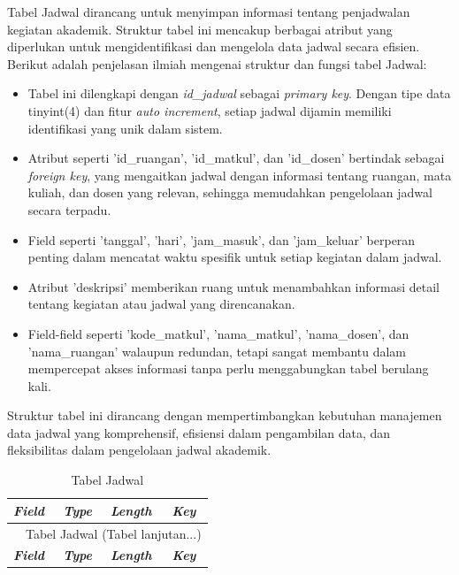 \begin{enumerate}
	      Tabel Jadwal dirancang untuk menyimpan informasi tentang penjadwalan kegiatan akademik. Struktur tabel ini mencakup berbagai atribut yang diperlukan untuk mengidentifikasi dan mengelola data jadwal secara efisien. Berikut adalah penjelasan ilmiah mengenai struktur dan fungsi tabel Jadwal:

	      \begin{itemize}
		      \item Tabel ini dilengkapi dengan \textit{id\_jadwal} sebagai \textit{primary key}. Dengan tipe data tinyint(4) dan fitur \textit{auto increment}, setiap jadwal dijamin memiliki identifikasi yang unik dalam sistem.
		      \item Atribut seperti 'id\_ruangan', 'id\_matkul', dan 'id\_dosen' bertindak sebagai \textit{foreign key}, yang mengaitkan jadwal dengan informasi tentang ruangan, mata kuliah, dan dosen yang relevan, sehingga memudahkan pengelolaan jadwal secara terpadu.
		      \item Field seperti 'tanggal', 'hari', 'jam\_masuk', dan 'jam\_keluar' berperan penting dalam mencatat waktu spesifik untuk setiap kegiatan dalam jadwal.
		      \item Atribut 'deskripsi' memberikan ruang untuk menambahkan informasi detail tentang kegiatan atau jadwal yang direncanakan.
		      \item Field-field seperti 'kode\_matkul', 'nama\_matkul', 'nama\_dosen', dan 'nama\_ruangan' walaupun redundan, tetapi sangat membantu dalam mempercepat akses informasi tanpa perlu menggabungkan tabel berulang kali.
	      \end{itemize}

	      Struktur tabel ini dirancang dengan mempertimbangkan kebutuhan manajemen data jadwal yang komprehensif, efisiensi dalam pengambilan data, dan fleksibilitas dalam pengelolaan jadwal akademik.

		      {
			      \fontsize{10}{12}\selectfont
			      \begin{longtable}{l l l l}
				      \caption{Tabel Jadwal}
				      \label{admin}                                                                                       \\
				      \hline
				      \textbf{\textit{Field}} & \textbf{\textit{Type}} & \textbf{\textit{Length}} & \textbf{\textit{Key}} \\
				      \hline
				      \endfirsthead

				      \multicolumn{4}{c}{\tablename\ \thetable\ {Tabel Jadwal} \space (Tabel lanjutan...)}                \\
				      \hline
				      \textbf{\textit{Field}} & \textbf{\textit{Type}} & \textbf{\textit{Length}} & \textbf{\textit{Key}} \\
				      \hline
				      \endhead


\end{longtable}}
\end{enumerate}
